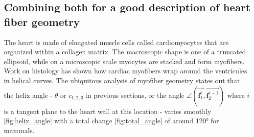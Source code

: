 \subsection{Combining both for a good description of heart fiber geometry}

The heart is made of elongated muscle cells called cardiomyocytes that are organized within a collagen matrix. The macroscopic shape is one of a truncated ellipsoid, while on a microscopic scale myocytes are stacked and form myofibers.\\
Work on histology has shown how cardiac myofibers wrap around the ventricules in helical curves. The ubiquitous analysis of myofiber geometry states out that the helix angle - $\theta$ or $c_{1,2,3}$ in previous sections, or the angle $\angle (\overrightarrow{\mathbf{f}^{i}_1}, \overrightarrow{\mathbf{f}^{i+1}_2})$ where $i$ is a tangent plane to the heart wall at this location - varies smoothly \ref{fig:helix_angle} with a total change \ref{fig:total_angle} of around 120° for mammals.\\
